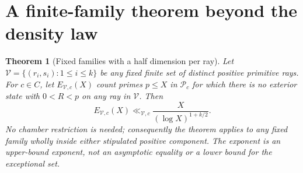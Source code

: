 \documentclass[11pt]{article}
\newtheorem{theorem}{Theorem}[section]
\theoremstyle{remark}\newtheorem{remark}[theorem]{Remark}
\newcommand{\Pcal}{\mathcal P}
\begin{document}
\section{A finite-family theorem beyond the density law}\label{sec:sieve}
\begin{theorem}[Fixed families with a half dimension per ray]\label{thm:family}
Let $\mathcal V=\{(r_i,s_i):1\le i\le k\}$ be any fixed finite set of distinct positive primitive rays. For $c\in C$, let $E_{\mathcal V,c}(X)$ count primes $p\le X$ in $\Pcal_c$ for which there is no exterior state with $0<R<p$ on any ray in $\mathcal V$. Then
\begin{equation}\label{eq:familybound}
 E_{\mathcal V,c}(X)\ll_{\mathcal V,c}\frac{X}{(\log X)^{1+k/2}}.
\end{equation}
No chamber restriction is needed; consequently the theorem applies to any fixed family wholly inside either stipulated positive component. The exponent is an upper-bound exponent, not an asymptotic equality or a lower bound for the exceptional set.
\end{theorem}
\end{document}
